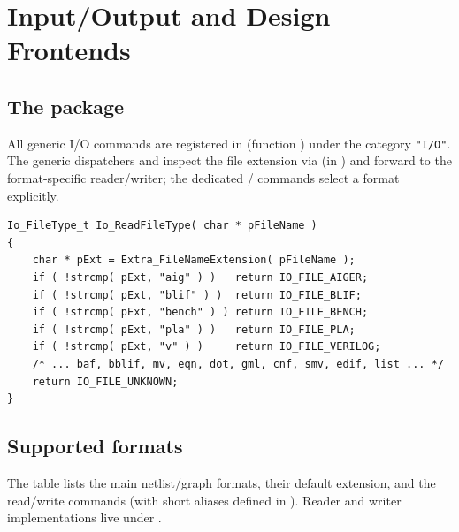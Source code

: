 \chapter{Input/Output and Design Frontends}
\label{ch:io}


\section{The  package}

All generic I/O commands are registered in  (function
) under the category \texttt{"I/O"}. The generic dispatchers
 and  inspect the file extension via
 (in ) and forward to the
format-specific reader/writer; the dedicated /
commands select a format explicitly.

\begin{lstlisting}[style=abccode,caption={Extension dispatch (\file{src/base/io/ioUtil.c}).}]
Io_FileType_t Io_ReadFileType( char * pFileName )
{
    char * pExt = Extra_FileNameExtension( pFileName );
    if ( !strcmp( pExt, "aig" ) )   return IO_FILE_AIGER;
    if ( !strcmp( pExt, "blif" ) )  return IO_FILE_BLIF;
    if ( !strcmp( pExt, "bench" ) ) return IO_FILE_BENCH;
    if ( !strcmp( pExt, "pla" ) )   return IO_FILE_PLA;
    if ( !strcmp( pExt, "v" ) )     return IO_FILE_VERILOG;
    /* ... baf, bblif, mv, eqn, dot, gml, cnf, smv, edif, list ... */
    return IO_FILE_UNKNOWN;
}
\end{lstlisting}

\section{Supported formats}

The table lists the main netlist/graph formats, their default extension, and the
read/write commands (with short aliases defined in ). Reader and
writer implementations live under .

